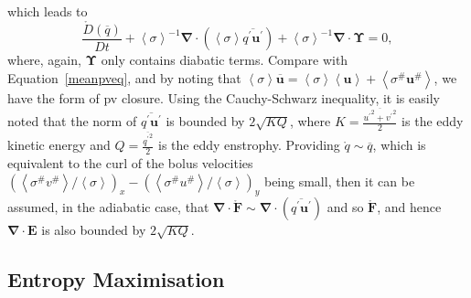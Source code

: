 \documentclass[10pt,a4paper]{report}
\newcommand*\thkmean[1]{\overline{#1}}
\newcommand*\thkres[1]{{#1}^{\prime}}
\newcommand*\nthkmean[1]{\left\langle{#1}\right\rangle}
\newcommand*\nthkres[1]{{#1}^{\#}}
\newcommand*\spec[1]{\mathring{#1}}
\newcommand*\equref[1]{Equation~\eqref{#1}}
\begin{document}
                      which leads  to
                      \begin{equation}
                      \frac{\spec{D} \left( \thkmean{q}\right)}{D t}
                      + \nthkmean{\sigma}^{-1}\boldsymbol{\nabla}\cdot\left(\nthkmean{\sigma}\thkmean{\thkres{q} \thkres{\boldsymbol{u}}}\right)
                      +\nthkmean{\sigma}^{-1}\boldsymbol{\nabla}\cdot\boldsymbol{\Upsilon}=0 ,
                      \end{equation}
                      where, again, $\boldsymbol{\Upsilon}$ only contains
                      diabatic terms. Compare with \equref{meanpveq}, and by noting that
                       ${\nthkmean{\sigma}\thkmean{\boldsymbol{u}}=\nthkmean{\sigma}\nthkmean{\boldsymbol{u}} + \nthkmean{\nthkres{\sigma}\nthkres{\boldsymbol{u}}}}$, we have the 
                       \cite{greatbatch1998exploring} form of \gls{pv} closure.
                       Using the Cauchy-Schwarz inequality, it is easily noted that
                       the norm of $\thkmean{\thkres{q} \thkres{\boldsymbol{u}}}$ is bounded
                       by $2\sqrt{KQ}$, where $K = \frac{\thkmean{{\thkres{u}}^{2} +
                       	{\thkres{v}}^{2}}}{2}$ is the eddy kinetic energy and $Q =
                        \frac{\thkmean{{\thkres{q}}^{2}}}{2}$ is the eddy enstrophy.
                       Providing $\spec{q} \sim \thkmean{q}$, which is equivalent 
                       to the  curl of the bolus velocities $\left(\nthkmean{\nthkres{\sigma}\nthkres{v}}/\nthkmean{\sigma}\right)_{x}-\left(\nthkmean{\nthkres{\sigma}\nthkres{u}}/\nthkmean{\sigma}\right)_{y}$ 
                       being small, then it can be assumed, in the adiabatic case,
                       that $\boldsymbol{\nabla}\cdot\spec{\boldsymbol{F}} \sim \boldsymbol{\nabla}\cdot\left(\thkmean{\thkres{q} \thkres{\boldsymbol{u}}}\right)$ and so $\spec{\boldsymbol{F}}$,
                       and hence $\boldsymbol{\nabla}\cdot\boldsymbol{E}$
                       is also bounded by  $2\sqrt{KQ}$.
                       
                       
                      
                      
                      
                      
                      
                      \subsection{Entropy  Maximisation}
                      \label{entropy}
                     
\end{document}
